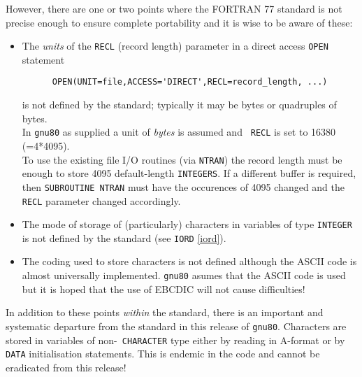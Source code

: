 However, there are one or two points where the FORTRAN 77 standard is
not precise enough to ensure complete portability and it is wise to be
aware of these:
\begin{itemize}
\item The {\em units} of the {\tt RECL} (record length) parameter in a
  direct access {\tt OPEN} statement
\begin{verbatim}
      OPEN(UNIT=file,ACCESS='DIRECT',RECL=record_length, ...)
\end{verbatim}
  is not defined by the standard;
  typically it may be bytes or quadruples of bytes. \\
  In {\tt gnu80} as supplied a unit of {\em bytes} is assumed and {\tt
    RECL}
  is set to 16380 (=4*4095). \\
  To use the existing file I/O routines (via {\tt NTRAN}) the record
  length must be enough to store 4095 default-length {\tt INTEGERS}.
  If a different buffer is required, then {\tt SUBROUTINE NTRAN} must
  have the occurences of 4095 changed and the {\tt RECL} parameter
  changed accordingly.
\item The mode of storage of (particularly) characters in variables of
  type {\tt INTEGER} is not defined by the standard (see {\tt IORD}
  \ref{iord}).
\item The coding used to store characters is not defined although the
  ASCII code is almost universally implemented. {\tt gnu80} asumes
  that the ASCII code is used but it is hoped that the use of EBCDIC
  will not cause difficulties!
\end{itemize}
In addition to these points {\em within} the standard, there is an
important and systematic departure from the standard in this release
of {\tt gnu80}. Characters are stored in variables of non-{\tt
  CHARACTER} type either by reading in A-format or by {\tt DATA}
initialisation statements. This is endemic in the code and cannot be
eradicated from this release!
\begin{center}
\end{center}

